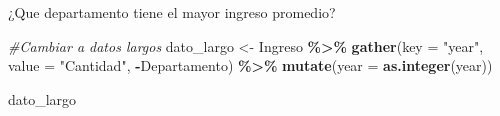\documentclass[
  ignorenonframetext,
]{beamer}
\newenvironment{Shaded}{\begin{snugshade}}{\end{snugshade}}
\newcommand{\AttributeTok}[1]{\textcolor[rgb]{0.13,0.29,0.53}{#1}}
\newcommand{\CommentTok}[1]{\textcolor[rgb]{0.56,0.35,0.01}{\textit{#1}}}
\newcommand{\FunctionTok}[1]{\textcolor[rgb]{0.13,0.29,0.53}{\textbf{#1}}}
\newcommand{\NormalTok}[1]{#1}
\newcommand{\OtherTok}[1]{\textcolor[rgb]{0.56,0.35,0.01}{#1}}
\newcommand{\SpecialCharTok}[1]{\textcolor[rgb]{0.81,0.36,0.00}{\textbf{#1}}}
\newcommand{\StringTok}[1]{\textcolor[rgb]{0.31,0.60,0.02}{#1}}
\begin{document}
\begin{frame}[fragile]{¿Que departamento tiene el mayor ingreso
promedio?}
\protect\hypertarget{que-departamento-tiene-el-mayor-ingreso-promedio-1}{}
\begin{Shaded}
\begin{Highlighting}[]
\CommentTok{\#Cambiar a datos largos}
\NormalTok{dato\_largo }\OtherTok{\textless{}{-}}\NormalTok{ Ingreso }\SpecialCharTok{\%\textgreater{}\%}
  \FunctionTok{gather}\NormalTok{(}\AttributeTok{key =} \StringTok{"year"}\NormalTok{, }\AttributeTok{value =} \StringTok{"Cantidad"}\NormalTok{, }\SpecialCharTok{{-}}\NormalTok{Departamento) }\SpecialCharTok{\%\textgreater{}\%}
  \FunctionTok{mutate}\NormalTok{(}\AttributeTok{year =} \FunctionTok{as.integer}\NormalTok{(year))}

\NormalTok{dato\_largo}
\end{Highlighting}
\end{Shaded}


\end{frame}
\end{document}
